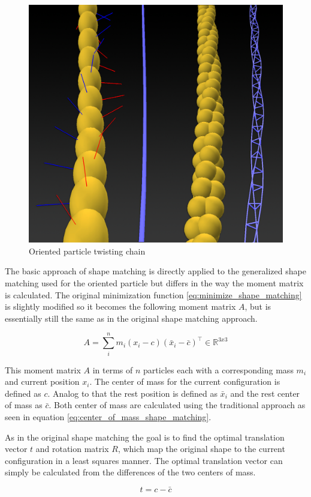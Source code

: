\begin{figure}[htb]
\centering
\includegraphics[width=.5\textwidth]{images/oriented_particle_twist_chain.png}
\caption{Oriented particle twisting chain}
\label{img:oriented_particle_twist_chain}
\end{figure}

The basic approach of shape matching is directly applied to the generalized shape matching used for the oriented particle but differs in the way the moment matrix is calculated. The original minimization function \ref{eq:minimize_shape_matching} is slightly modified so it becomes the following moment matrix $A$, but is essentially still the same as in the original shape matching approach.

\begin{equation}
A = \sum\limits_i^n m_i(x_i-c)(\bar{x}_i - \bar{c})^\top  \in \mathbb{R}^{3x3}
\label{eq:minimize_oriented_particle_1}
\end{equation}

This moment matrix $A$ in terms of $n$ particles each with a corresponding mass $m_i$ and current position $x_i$. The center of mass for the current configuration is defined as $c$. Analog to that the rest position is defined as $\bar{x}_i$ and the rest center of mass as $\bar{c}$. Both center of mass are calculated using the traditional approach as seen in equation \ref{eq:center_of_mass_shape_matching}.

As in the original shape matching the goal is to find the optimal translation vector $t$ and rotation matrix $R$, which map the original shape to the current configuration in a least squares manner. The optimal translation vector can simply be calculated from the differences of the two centers of mass.

\begin{equation}
t = c - \bar{c}
\end{equation}

